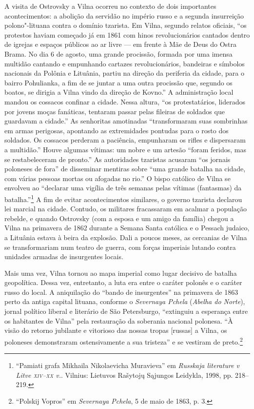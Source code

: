 %

A visita de Ostrovsky a Vilna ocorreu no contexto de dois importantes
acontecimentos: a abolição da servidão no império russo e a segunda
insurreição polono"-lituana contra o domínio tzarista. Em Vilna, segundo
relatos oficiais, ``os protestos haviam começado já em 1861 com hinos
revolucionários cantados dentro de igrejas e espaços públicos ao ar
livre --- em frente à Mãe de Deus do Ostra Brama. No dia 6 de agosto, uma
grande procissão, formada por uma imensa multidão cantando e empunhando
cartazes revolucionários, bandeiras e símbolos nacionais da Polônia e
Lituânia, partiu na direção da periferia da cidade, para o bairro
Pohulianka, a fim de se juntar a uma outra procissão que, segundo os
boatos, se dirigia a Vilna vindo da direção de Kovno.'' A administração
local mandou os cossacos confinar a cidade. Nessa altura, ``os
protestatários, liderados por jovens moças fanáticas, tentaram passar
pelas fileiras de soldados que guardavam a cidade.'' As senhoritas
amotinadas ``transformaram suas sombrinhas em armas perigosas, apontando
as extremidades pontudas para o rosto dos soldados. Os cossacos perderam
a paciência, empunharam os rifles e dispersaram a multidão.'' Houve
algumas vítimas: um nobre e um artesão ``foram feridos, mas se
restabeleceram de pronto.'' As autoridades tzaristas acusaram ``os
jornais poloneses de fora'' de disseminar mentiras sobre ``uma grande
batalha na cidade, com várias pessoas mortas ou afogadas no rio.'' O
bispo católico de Vilna se envolveu ao ``declarar uma vigília de três
semanas pelas vítimas (fantasmas) da batalha.''\footnote{``Pamiati grafa Mikhaila Nikolaevicha Muravieva'' em \textit{Russkaja literature v Litve \textsc{xiv}--\textsc{xx} v.}. Vilnius: Lietuvos Rašytojų Sąjungos Leidykla, 1998, pp. 218--219.} A fim de evitar acontecimentos similares, o governo tzarista declarou lei marcial na cidade. Contudo,
os militares fracassaram em acalmar a população rebelde, e quando
Ostrovsky (com a esposa e um amigo da família) chegou a Vilna na
primavera de 1862 durante a Semana Santa católica e o Pessach judaico, a
Lituânia estava à beira da explosão. Dali a poucos meses, as cercanias
de Vilna se transformariam num teatro de guerra, com forças imperiais
lutando contra unidades armadas de insurgentes locais.

Mais uma vez, Vilna tornou ao mapa imperial como lugar decisivo de
batalha geopolítica. Dessa vez, entretanto, a luta era entre o caráter
polonês e o caráter russo do local. A aniquilação do ``bando de
insurgentes'' na primavera de 1863 perto da antiga capital lituana,
conforme o \textit{Severnaya Pchela} (\textit{Abelha do Norte}), jornal
político liberal e literário de São Petersburgo, ``extinguiu a esperança
entre os habitantes de Vilna'' pela restauração da soberania nacional
polonesa. ``À visão do retorno jubilante e vitorioso das nossas tropas
{[}russas{]} a Vilna, os poloneses demonstraram ostensivamente a sua
tristeza'' e se vestiram de preto.\footnote{``Polskij Vopros'' em \textit{Severnaya Pchela}, 5 de maio de 1863, p. 3.}

